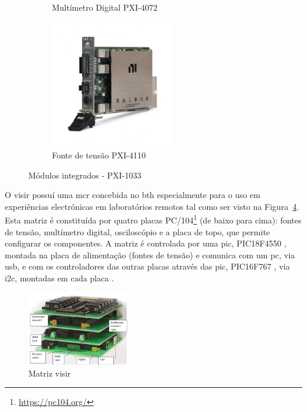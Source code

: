 \begin{figure}[hbtp]
\begin{subfigure}[hbtp]{0.48\textwidth}
        \caption{Multímetro Digital PXI-4072 \cite{PXI-4072}}
        \label{fig:PXI-4072}
    \end{subfigure}
   \hfill
\begin{subfigure}[hbtp]{0.48\textwidth}
        \centering
        \includegraphics[width=0.6\textwidth]{figures/PXI-4110.png}
        \caption{Fonte de tensão PXI-4110 \cite{PXI-4110}}
        \label{fig:PXI-4110}
    \end{subfigure}
    \caption{Módulos integrados - PXI-1033}
    \label{fig:modulospxi}
\end{figure}

O \acrshort{visir} possuí uma \acrfull{mcr} concebida no \acrshort{bth} especialmente para o uso em experiências electrónicas em laboratórios remotos tal como ser visto na Figura~\ref{fig:matrizvisir}. Esta matriz é constituída por quatro placas PC/104\footnote{\url{https://pc104.org/}} (de baixo para cima): fontes de tensão, multímetro digital, osciloscópio e a placa de topo, que permite configurar os componentes. A matriz é controlada por uma \acrfull{pic}, PIC18F4550 \cite{PIC18F4516datasheet}, montada na placa de alimentação (fontes de tensão) e comunica com um \acrshort{pc}, via \acrfull{usb}, e com os controladores das outras placas através das \acrshort{pic}, PIC16F767 \cite{PIC16F7675datasheet}, via \acrfull{i2c}, montadas em cada placa \cite{matriz}.

\begin{figure}[hbtp]
    \centering
    \includegraphics[width=0.4\textwidth]{figures/matriz.png}
    \caption{Matriz \acrshort{visir}\cite{matriz}}
    \label{fig:matrizvisir}
\end{figure}

